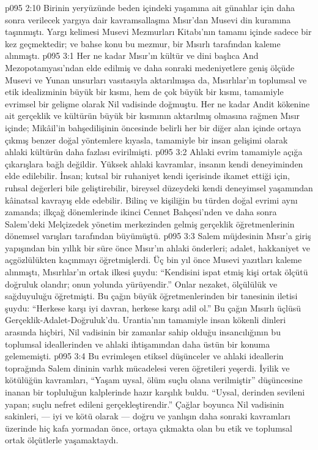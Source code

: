 \vs p095 2:10 Birinin yeryüzünde beden içindeki yaşamına ait günahlar için daha sonra verilecek yargıya dair kavramsallaşma Mısır’dan Musevi din kuramına taşınmıştı. Yargı kelimesi Musevi Mezmurları Kitabı’nın tamamı içinde sadece bir kez geçmektedir; ve bahse konu bu mezmur, bir Mısırlı tarafından kaleme alınmıştı.
\vs p095 3:1 Her ne kadar Mısır’ın kültür ve dini başlıca And Mezopotamyası’ndan elde edilmiş ve daha sonraki medeniyetlere geniş ölçüde Musevi ve Yunan unsurları vasıtasıyla aktarılmışsa da, Mısırlılar’ın toplumsal ve etik idealizminin büyük bir kısmı, hem de çok büyük bir kısmı, tamamiyle evrimsel bir gelişme olarak Nil vadisinde doğmuştu. Her ne kadar Andit kökenine ait gerçeklik ve kültürün büyük bir kısmının aktarılmış olmasına rağmen Mısır içinde; Mikâil’in bahşedilişinin öncesinde belirli her bir diğer alan içinde ortaya çıkmış benzer doğal yöntemlere kıyasla, tamamiyle bir insan gelişimi olarak ahlaki kültürün daha fazlası evirilmişti.
\vs p095 3:2 Ahlaki evrim tamamiyle açığa çıkarışlara bağlı değildir. Yüksek ahlaki kavramlar, insanın kendi deneyiminden elde edilebilir. İnsan; kutsal bir ruhaniyet kendi içerisinde ikamet ettiği için, ruhsal değerleri bile geliştirebilir, bireysel düzeydeki kendi deneyimsel yaşamından kâinatsal kavrayış elde edebilir. Bilinç ve kişiliğin bu türden doğal evrimi aynı zamanda; ilkçağ dönemlerinde ikinci Cennet Bahçesi’nden ve daha sonra Salem’deki Melçizedek yönetim merkezinden gelmiş gerçeklik öğretmenlerinin dönemsel varışları tarafından büyümüştü.
\vs p095 3:3 Salem müjdesinin Mısır’a giriş yapışından bin yıllık bir süre önce Mısır’ın ahlaki önderleri; adalet, hakkaniyet ve açgözlülükten kaçınmayı öğretmişlerdi. Üç bin yıl önce Musevi yazıtları kaleme alınmıştı, Mısırlılar’ın ortak ilkesi şuydu: “Kendisini ispat etmiş kişi ortak ölçütü doğruluk olandır; onun yolunda yürüyendir.” Onlar nezaket, ölçülülük ve sağduyuluğu öğretmişti. Bu çağın büyük öğretmenlerinden bir tanesinin iletisi şuydu: “Herkese karşı iyi davran, herkese karşı adil ol.” Bu çağın Mısırlı üçlüsü Gerçeklik\hyp{}Adalet\hyp{}Doğruluk’du. Urantia’nın tamamiyle insan kökenli dinleri arasında hiçbiri, Nil vadisinin bir zamanlar sahip olduğu insancılığının bu toplumsal ideallerinden ve ahlaki ihtişamından daha üstün bir konuma gelememişti.
\vs p095 3:4 Bu evrimleşen etiksel düşünceler ve ahlaki ideallerin toprağında Salem dininin varlık mücadelesi veren öğretileri yeşerdi. İyilik ve kötülüğün kavramları, “Yaşam uysal, ölüm suçlu olana verilmiştir” düşüncesine inanan bir topluluğun kalplerinde hazır karşılık buldu. “Uysal, derinden sevileni yapan; suçlu nefret edileni gerçekleştirendir.” Çağlar boyunca Nil vadisinin sakinleri, --- iyi ve kötü olarak --- doğru ve yanlışın daha sonraki kavramları üzerinde hiç kafa yormadan önce, ortaya çıkmakta olan bu etik ve toplumsal ortak ölçütlerle yaşamaktaydı.
